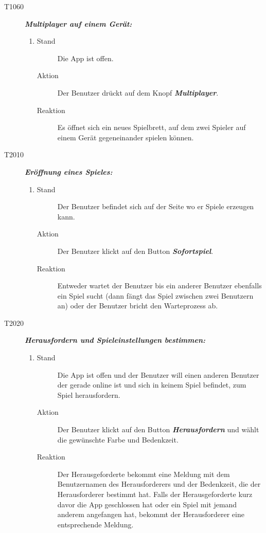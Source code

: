 \documentclass[parskip=full]{scrartcl}
\begin{document}
\begin{description}
	\item[T1060] \textbf{\textit{Multiplayer auf einem Gerät: }} 
	\begin{enumerate}
		\item 
		\begin{description}
			\item[Stand] Die App ist offen.
			\item[Aktion] Der Benutzer drückt auf dem Knopf \textbf{\textit{Multiplayer}}.
			\item[Reaktion] Es öffnet sich ein neues Spielbrett, auf dem zwei Spieler auf einem Gerät gegeneinander spielen können.
		\end{description}
	\end{enumerate}
	
	\item[T2010] \textbf{\textit{Eröffnung eines Spieles: }} 
	\begin{enumerate}
		\item 
		\begin{description}
			\item[Stand] Der Benutzer befindet sich auf der Seite wo er Spiele erzeugen kann.
			\item[Aktion] Der Benutzer klickt auf den Button \textbf{\textit{Sofortspiel}}. 
			\item[Reaktion] Entweder wartet der Benutzer bis ein anderer Benutzer ebenfalls ein Spiel sucht (dann fängt das Spiel zwischen zwei Benutzern an) oder der Benutzer bricht den Warteprozess ab.
		\end{description}
	\end{enumerate}
	
	\item[T2020] \textbf{\textit{Herausfordern und Spieleinstellungen bestimmen: }} 
	\begin{enumerate}
		\item 
		\begin{description}
			\item[Stand] Die App ist offen und der Benutzer will einen anderen Benutzer der gerade online ist und sich in keinem Spiel befindet, zum Spiel herausfordern.
			\item[Aktion] Der Benutzer klickt auf den Button \textbf{\textit{Herausfordern }} und wählt die gewünschte Farbe und \gls{Bedenkzeit}.
			\item[Reaktion] Der Herausgeforderte bekommt eine Meldung mit dem Benutzernamen des Herausforderers und der \gls{Bedenkzeit}, die der Herausforderer bestimmt hat. Falls der Herausgeforderte kurz davor die App geschlossen hat oder ein Spiel mit jemand anderem angefangen hat, bekommt der Herausforderer eine entsprechende Meldung.
		\end{description}
	\end{enumerate}
	

\end{description}
\end{document}
